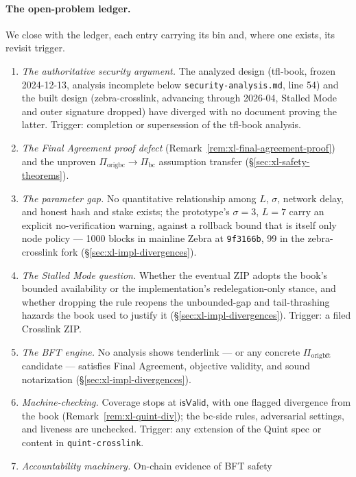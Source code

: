 \documentclass[11pt,a4paper]{article}
\theoremstyle{definition}
\begin{document}
\paragraph{The open-problem ledger.} We close with the ledger, each entry
carrying its bin and, where one exists, its revisit trigger.

\begin{enumerate}
\item \emph{The authoritative security argument.} The analyzed design
  (tfl-book, frozen 2024-12-13, analysis incomplete below
  \texttt{security-analysis.md}, line 54) and the built design
  (zebra-crosslink, advancing through 2026-04, Stalled Mode and outer
  signature dropped) have diverged with no document proving the latter.
  Trigger: completion or supersession of the tfl-book analysis.
\item \emph{The Final Agreement proof defect}
  (Remark~\ref{rem:xl-final-agreement-proof}) and the unproven
  $\Pi_{\mathrm{origbc}} \to \Pi_{\mathrm{bc}}$ assumption transfer
  (\S\ref{sec:xl-safety-theorems}).
\item \emph{The parameter gap.} No quantitative relationship among $L$,
  $\sigma$, network delay, and honest hash and stake exists; the
  prototype's $\sigma = 3$, $L = 7$ carry an explicit no-verification
  warning, against a rollback bound that is itself only node policy ---
  1000 blocks in mainline Zebra at \texttt{9f3166b}, 99 in the
  zebra-crosslink fork (\S\ref{sec:xl-impl-divergences}).
\item \emph{The Stalled Mode question.} Whether the eventual ZIP adopts
  the book's bounded availability or the implementation's
  redelegation-only stance, and whether dropping the rule reopens the
  unbounded-gap and tail-thrashing hazards the book used to justify it
  (\S\ref{sec:xl-impl-divergences}). Trigger: a filed Crosslink ZIP.
\item \emph{The BFT engine.} No analysis shows tenderlink --- or any
  concrete $\Pi_{\mathrm{origbft}}$ candidate --- satisfies Final
  Agreement, objective validity, and sound notarization
  (\S\ref{sec:xl-impl-divergences}).
\item \emph{Machine-checking.} Coverage stops at
  $\mathsf{isValid}$, with one flagged divergence from the book
  (Remark~\ref{rem:xl-quint-div}); the bc-side rules, adversarial
  settings, and liveness are unchecked. Trigger: any extension of the
  Quint spec or content in \texttt{quint-crosslink}.
\item \emph{Accountability machinery.} On-chain evidence of BFT safety

\end{enumerate}
\end{document}
